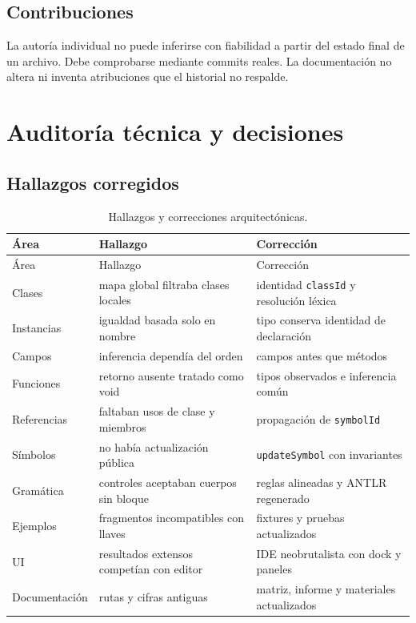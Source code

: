 \documentclass[11pt,letterpaper,oneside]{report}
\newcommand{\codigo}[1]{\texttt{#1}}
\begin{document}
\section{Contribuciones}

La autoría individual no puede inferirse con fiabilidad a partir del estado final de
un archivo. Debe comprobarse mediante commits reales. La documentación no altera ni
inventa atribuciones que el historial no respalde.

\chapter{Auditoría técnica y decisiones}

\section{Hallazgos corregidos}

\begin{longtable}{p{}p{}p{}}
\caption{Hallazgos y correcciones arquitectónicas.}\label{tab:audit}\\
\toprule
Área & Hallazgo & Corrección \\
\midrule
\endfirsthead
\toprule
Área & Hallazgo & Corrección \\
\midrule
\endhead
Clases & mapa global filtraba clases locales & identidad \codigo{classId} y resolución léxica \\
Instancias & igualdad basada solo en nombre & tipo conserva identidad de declaración \\
Campos & inferencia dependía del orden & campos antes que métodos \\
Funciones & retorno ausente tratado como void & tipos observados e inferencia común \\
Referencias & faltaban usos de clase y miembros & propagación de \codigo{symbolId} \\
Símbolos & no había actualización pública & \codigo{updateSymbol} con invariantes \\
Gramática & controles aceptaban cuerpos sin bloque & reglas alineadas y ANTLR regenerado \\
Ejemplos & fragmentos incompatibles con llaves & fixtures y pruebas actualizados \\
UI & resultados extensos competían con editor & IDE neobrutalista con dock y paneles \\
Documentación & rutas y cifras antiguas & matriz, informe y materiales actualizados \\
\bottomrule
\end{longtable}
\end{document}
